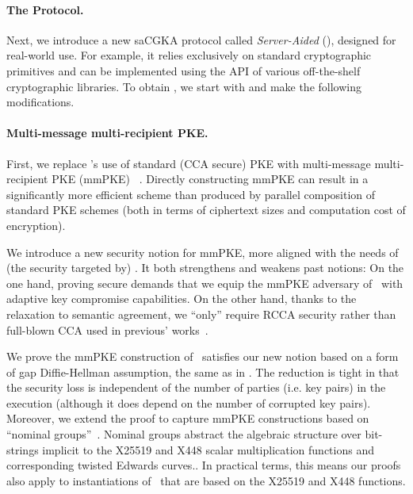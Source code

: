 \paragraph{The \saik Protocol.}
Next, we introduce a new saCGKA protocol called
\emph{Server-Aided \protITK} (\saik), designed for real-world use.
For example, it relies exclusively on standard cryptographic primitives and
can be implemented using the API of various off-the-shelf cryptographic
libraries. To obtain \saik, we start with \protITK and make the following
modifications.

\paragraph{Multi-message multi-recipient PKE.} First, we
replace \protITK's use of standard (CCA secure) PKE with multi-message
multi-recipient PKE (mmPKE) ~\cite{ASIACCS:PinPoeSch14}.
Directly constructing mmPKE can result in a significantly more efficient
scheme than produced by parallel composition of standard PKE schemes (both in
terms of ciphertext sizes and computation cost of encryption).

We introduce a new security notion for mmPKE, more aligned with the needs of
(the security targeted by) \saik. It both strengthens and weakens past
notions: On the one hand, proving \saik secure demands that we equip the
mmPKE adversary of~\cite{ASIACCS:PinPoeSch14} with adaptive key compromise
capabilities. On the other hand, thanks to the relaxation to semantic
agreement, we ``only'' require RCCA
security rather than full-blown CCA used in previous'
works~\cite{TCC:ACJM20,EPRINT:AlwJosMul20}.

We prove the mmPKE construction of~\cite{ASIACCS:PinPoeSch14} satisfies our
new notion based on a form of gap Diffie-Hellman assumption, the same as in
\cite{ASIACCS:PinPoeSch14}. The reduction is tight in that the security loss
is independent of the number of parties (i.e. key pairs) in the execution
(although it does depend on the number of corrupted key pairs). Moreover, we
extend the proof to capture mmPKE constructions based on ``nominal
groups''~\cite{EC:ABHKLR21_2}. Nominal groups abstract the algebraic
structure over bit-strings implicit to the X25519 and X448 scalar
multiplication functions and corresponding twisted Edwards
curves.\cite{rfc7748}. In practical terms, this means our proofs also apply
to instantiations of~\cite{ASIACCS:PinPoeSch14} that are based on the X25519
and X448 functions.

